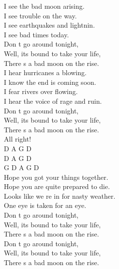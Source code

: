 \documentclass[10pt, twoside, a4paper]{article}
\begin{document}
\begin{multicols}{2}

I see the bad moon arising.\\
I see trouble on the way.\\
I see earthquakes and lightnin.\\
I see bad times today.\\

Don t go around tonight,\\
Well, its bound to take your life,\\
There s a bad moon on the rise.\\

I hear hurricanes a blowing.\\
I know the end is coming soon.\\
I fear rivers over flowing.\\
I hear the voice of rage and ruin.\\

Don t go around tonight,\\
Well, its bound to take your life,\\
There s a bad moon on the rise.\\
All right!\\

D A G D\\
D A G D\\
G D A G D\\

Hope you got your things together.\\
Hope you are quite prepared to die.\\
Looks like we re in for nasty weather.\\
One eye is taken for an eye.\\

Don t go around tonight,\\
Well, its bound to take your life,\\
There s a bad moon on the rise.\\

Don t go around tonight,\\
Well, its bound to take your life,\\
There s a bad moon on the rise.\\

\end{multicols}
\end{document}
